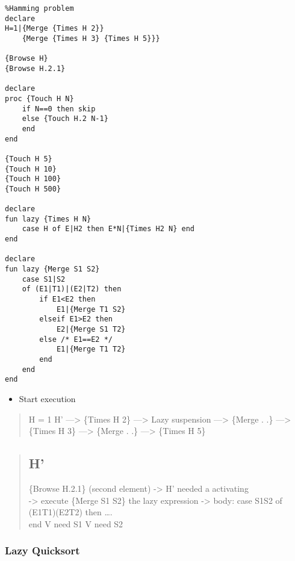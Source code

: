 \documentclass[]{article}
\providecommand{\tightlist}{%
  \setlength{\itemsep}{0pt}\setlength{\parskip}{0pt}}
\begin{document}
\begin{verbatim}
%Hamming problem
declare
H=1|{Merge {Times H 2}}
    {Merge {Times H 3} {Times H 5}}}
    
{Browse H}
{Browse H.2.1}

declare
proc {Touch H N}
    if N==0 then skip
    else {Touch H.2 N-1}
    end
end

{Touch H 5}
{Touch H 10}
{Touch H 100}
{Touch H 500}

declare
fun lazy {Times H N}
    case H of E|H2 then E*N|{Times H2 N} end
end

declare
fun lazy {Merge S1 S2}
    case S1|S2
    of (E1|T1)|(E2|T2) then
        if E1<E2 then
            E1|{Merge T1 S2}
        elseif E1>E2 then
            E2|{Merge S1 T2}
        else /* E1==E2 */
            E1|{Merge T1 T2}
        end
    end
end
\end{verbatim}

\begin{itemize}
\tightlist
\item
  Start execution
\end{itemize}

\begin{quote}
H = 1 \textbar{} H' ---\textgreater{} \{Times H 2\} ---\textgreater{}
Lazy suspension \textbar{} \textbar{} ---\textgreater{} \{Merge . .\}
\textbar{} ---\textgreater{} \{Times H 3\} \textbar{} \textbar{}
---\textgreater{} \{Merge . .\} \textbar{} \textbar{} ---\textgreater{}
\{Times H 5\}
\end{quote}

\begin{quote}
\hypertarget{h}{%
\subsection{H'}\label{h}}

\{Browse H.2.1\} (second element) -\textgreater{} H' needed \textbar{} a
activating\\
-\textgreater{} execute \{Merge S1 S2\} \textbar{} the lazy expression
-\textgreater{} body: case S1\textbar{}S2 of
(E1\textbar{}T1)\textbar{}(E2\textbar{}T2) then \ldots{}. \textbar{}
\textbar{}\\
end V \textbar{} need S1 V need S2
\end{quote}

\hypertarget{lazy-quicksort}{%
\subsubsection{Lazy Quicksort}\label{lazy-quicksort}}
\end{document}

